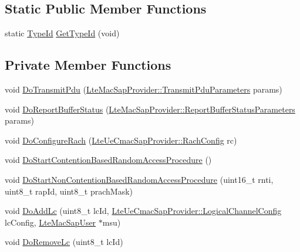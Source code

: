 \subsection*{Static Public Member Functions}
\begin{DoxyCompactItemize}
\item 
static \hyperlink{classns3_1_1TypeId}{Type\+Id} \hyperlink{classns3_1_1LteUeMac_a55b47f4684e70df7acd3306070cdd4cd}{Get\+Type\+Id} (void)
\end{DoxyCompactItemize}
\subsection*{Private Member Functions}
\begin{DoxyCompactItemize}
\item 
void \hyperlink{classns3_1_1LteUeMac_aa1a5f1f1b609931012506db7a57e345a}{Do\+Transmit\+Pdu} (\hyperlink{structns3_1_1LteMacSapProvider_1_1TransmitPduParameters}{Lte\+Mac\+Sap\+Provider\+::\+Transmit\+Pdu\+Parameters} params)
\item 
void \hyperlink{classns3_1_1LteUeMac_a2616f2e50358434be68b28e21e107528}{Do\+Report\+Buffer\+Status} (\hyperlink{structns3_1_1LteMacSapProvider_1_1ReportBufferStatusParameters}{Lte\+Mac\+Sap\+Provider\+::\+Report\+Buffer\+Status\+Parameters} params)
\item 
void \hyperlink{classns3_1_1LteUeMac_a65671efdf6a6e95abc0bb51b86240c98}{Do\+Configure\+Rach} (\hyperlink{structns3_1_1LteUeCmacSapProvider_1_1RachConfig}{Lte\+Ue\+Cmac\+Sap\+Provider\+::\+Rach\+Config} rc)
\item 
void \hyperlink{classns3_1_1LteUeMac_ae024404f1a77f77585df4536772f778c}{Do\+Start\+Contention\+Based\+Random\+Access\+Procedure} ()
\item 
void \hyperlink{classns3_1_1LteUeMac_ace6376d23fe64780db0d61956ff123d6}{Do\+Start\+Non\+Contention\+Based\+Random\+Access\+Procedure} (uint16\+\_\+t rnti, uint8\+\_\+t rap\+Id, uint8\+\_\+t prach\+Mask)
\item 
void \hyperlink{classns3_1_1LteUeMac_ad52ddf3357daaa28a59497b33eb0f771}{Do\+Add\+Lc} (uint8\+\_\+t lc\+Id, \hyperlink{structns3_1_1LteUeCmacSapProvider_1_1LogicalChannelConfig}{Lte\+Ue\+Cmac\+Sap\+Provider\+::\+Logical\+Channel\+Config} lc\+Config, \hyperlink{classns3_1_1LteMacSapUser}{Lte\+Mac\+Sap\+User} $\ast$msu)
\item 
void \hyperlink{classns3_1_1LteUeMac_a752336055e3f2fe3f926f33b2d727024}{Do\+Remove\+Lc} (uint8\+\_\+t lc\+Id)
\item 

\end{DoxyCompactItemize}
